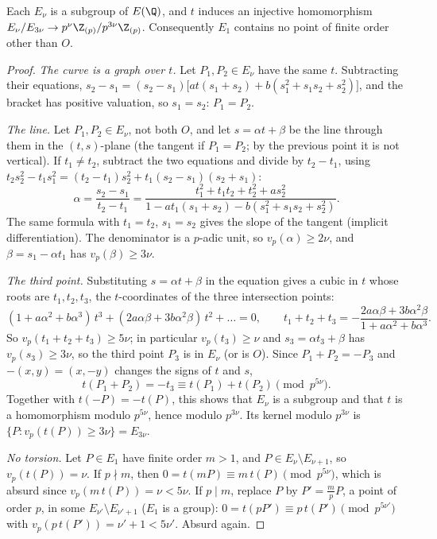 \begin{proposition}\label{prop:filtration}
Each $E_\nu$ is a subgroup of $E(\Q)$, and $t$ induces an injective homomorphism $E_\nu/E_{3\nu}\to p^\nu\Z_{(p)}/p^{3\nu}\Z_{(p)}$. Consequently $E_1$
contains no point of finite order other than $O$.
\end{proposition}
\begin{proof}
\emph{The curve is a graph over $t$.} Let $P_1,P_2\in E_\nu$ have the same $t$. Subtracting their equations,
$s_2-s_1=(s_2-s_1)\bigl[at(s_1+s_2)+b(s_1^2+s_1s_2+s_2^2)\bigr]$, and the bracket has positive valuation, so $s_1=s_2$: $P_1=P_2$.

\emph{The line.} Let $P_1,P_2\in E_\nu$, not both $O$, and let $s=\alpha t+\beta$ be the line through them in the $(t,s)$-plane (the tangent if $P_1=P_2$; by the
previous point it is not vertical). If $t_1\ne t_2$, subtract the two equations and divide by $t_2-t_1$, using
$t_2s_2^2-t_1s_1^2=(t_2-t_1)s_2^2+t_1(s_2-s_1)(s_2+s_1)$:
\[
\alpha=\frac{s_2-s_1}{t_2-t_1}=\frac{t_1^2+t_1t_2+t_2^2+as_2^2}{1-at_1(s_1+s_2)-b(s_1^2+s_1s_2+s_2^2)}.
\]
The same formula with $t_1=t_2$, $s_1=s_2$ gives the slope of the tangent (implicit differentiation). The denominator is a $p$-adic unit, so
$v_p(\alpha)\ge2\nu$, and $\beta=s_1-\alpha t_1$ has $v_p(\beta)\ge3\nu$.

\emph{The third point.} Substituting $s=\alpha t+\beta$ in the equation gives a cubic in $t$ whose roots are $t_1,t_2,t_3$, the $t$-coordinates of the three
intersection points:
\[
(1+a\alpha^2+b\alpha^3)\,t^3+(2a\alpha\beta+3b\alpha^2\beta)\,t^2+\dots=0,
\qquad t_1+t_2+t_3=-\frac{2a\alpha\beta+3b\alpha^2\beta}{1+a\alpha^2+b\alpha^3}.
\]
So $v_p(t_1+t_2+t_3)\ge5\nu$; in particular $v_p(t_3)\ge\nu$ and $s_3=\alpha t_3+\beta$ has $v_p(s_3)\ge3\nu$, so the third point $P_3$ is in $E_\nu$ (or is $O$). Since
$P_1+P_2=-P_3$ and $-(x,y)=(x,-y)$ changes the signs of $t$ and $s$,
\[
t(P_1+P_2)=-t_3\equiv t(P_1)+t(P_2)\pmod{p^{5\nu}}.
\]
Together with $t(-P)=-t(P)$, this shows that $E_\nu$ is a subgroup and that $t$ is a homomorphism modulo $p^{5\nu}$, hence modulo $p^{3\nu}$. Its
kernel modulo $p^{3\nu}$ is $\{P:v_p(t(P))\ge3\nu\}=E_{3\nu}$.

\emph{No torsion.} Let $P\in E_1$ have finite order $m>1$, and $P\in E_\nu\setminus E_{\nu+1}$, so $v_p(t(P))=\nu$. If $p\nmid m$, then
$0=t(mP)\equiv m\,t(P)\pmod{p^{5\nu}}$, which is absurd since $v_p(m\,t(P))=\nu<5\nu$. If $p\mid m$, replace $P$ by $P'=\frac mpP$, a point of order
$p$, in some $E_{\nu'}\setminus E_{\nu'+1}$ ($E_1$ is a group): $0=t(pP')\equiv p\,t(P')\pmod{p^{5\nu'}}$ with $v_p(p\,t(P'))=\nu'+1<5\nu'$. Absurd again.
\end{proof}

